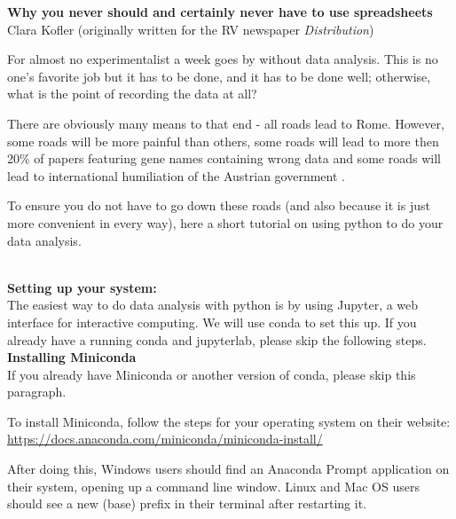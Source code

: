 \documentclass{article}
\begin{document}
\begin{center}
\textbf{ \Large Why you never should and certainly never have to use spreadsheets}\\
{Clara Kofler (originally written for the RV newspaper \emph{Distribution})}
\end{center}

For almost no experimentalist a week goes by without data analysis. This is no one's favorite job but it has to be done, and it has to be done well; otherwise, what is the point of recording the data at all?

There are obviously many means to that end - all roads lead to Rome. However, some roads will be more painful than others, some roads will lead to more then 20\% of papers featuring gene names containing wrong data \cite{Lewis2021} and some roads will lead to international humiliation of the Austrian government \cite{standard-excel}.

To ensure you do not have to go down these roads (and also because it is just more convenient in every way), here a short tutorial on using python to do your data analysis. 

\dotfill\\

\textbf{\large Setting up your system:}\\
The easiest way to do data analysis with python is by using Jupyter, a web interface for interactive computing. We will use conda to set this up. If you already have a running conda and jupyterlab, please skip the following steps.\\

\textbf{Installing Miniconda}\\
If you already have Miniconda or another version of conda, please skip this paragraph.

To install Miniconda, follow the steps for your operating system on their website: \url{https://docs.anaconda.com/miniconda/miniconda-install/}

After doing this, Windows users should find an Anaconda Prompt application on their system, opening up a command line window. Linux and Mac OS users should see a new (base) prefix in their terminal after restarting it.  \\
\end{document}
